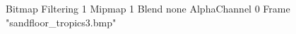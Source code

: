 {Bitmap
	{Filtering 1}
	{Mipmap 1}
	{Blend none}
	{AlphaChannel 0}
	{Frame "sandfloor_tropics3.bmp"}
}
